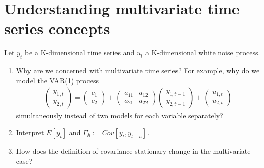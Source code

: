 \section[Understanding multivariate time series concepts]{Understanding multivariate time series concepts\label{ex:UnderstandingMultivariateTimeSeriesConcepts}}
Let \(y_t\) be a K-dimensional time series and \(u_t\) a K-dimensional white noise process.

\begin{enumerate}

\item Why are we concerned with multivariate time series?
For example, why do we model the VAR{(1)} process
\begin{align*}
\begin{pmatrix} y_{1,t} \\ y_{2,t} \end{pmatrix}
=
\begin{pmatrix} c_1 \\ c_2 \end{pmatrix}
+
\begin{pmatrix} a_{11} & a_{12} \\ a_{21} & a_{22} \end{pmatrix}
\begin{pmatrix} y_{1,{t-1}} \\ y_{2,{t-1}} \end{pmatrix}
+
\begin{pmatrix} u_{1,t} \\ u_{2,t}\end{pmatrix}
\end{align*}
simultaneously instead of two models for each variable separately?

\item Interpret \(E[y_t]\) and \(\Gamma_h := Cov[y_{t},y_{t-h}]\).

\item How does the definition of covariance stationary change in the multivariate case?


\end{enumerate}
